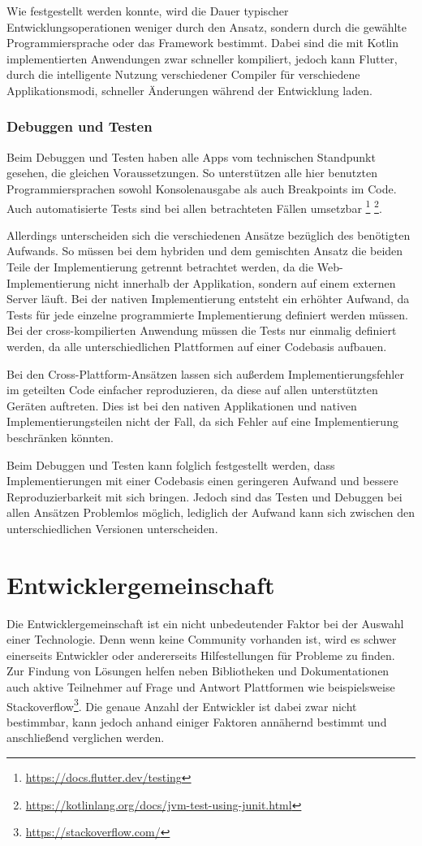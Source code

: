 Wie festgestellt werden konnte, wird die Dauer typischer Entwicklungsoperationen weniger durch den Ansatz, sondern durch die gewählte Programmiersprache oder das Framework bestimmt. Dabei sind die mit Kotlin implementierten Anwendungen zwar schneller kompiliert, jedoch kann Flutter, durch die intelligente Nutzung verschiedener Compiler für verschiedene Applikationsmodi, schneller Änderungen während der Entwicklung laden.

\subsubsection{Debuggen und Testen}
Beim Debuggen und Testen haben alle Apps vom technischen Standpunkt gesehen, die gleichen Voraussetzungen. So unterstützen alle hier benutzten Programmiersprachen sowohl Konsolenausgabe als auch Breakpoints im Code. Auch automatisierte Tests sind bei allen betrachteten Fällen umsetzbar \footnote{\url{https://docs.flutter.dev/testing}} \footnote{\url{https://kotlinlang.org/docs/jvm-test-using-junit.html}}.

Allerdings unterscheiden sich die verschiedenen Ansätze bezüglich des benötigten Aufwands. So müssen bei dem hybriden und dem gemischten Ansatz die beiden Teile der Implementierung getrennt betrachtet werden, da die Web-Implementierung nicht innerhalb der Applikation, sondern auf einem externen Server läuft. Bei der nativen Implementierung entsteht ein erhöhter Aufwand, da Tests für jede einzelne programmierte Implementierung definiert werden müssen. Bei der cross-kompilierten Anwendung müssen die Tests nur einmalig definiert werden, da alle unterschiedlichen Plattformen auf einer Codebasis aufbauen.

Bei den Cross-Plattform-Ansätzen lassen sich außerdem Implementierungsfehler im geteilten Code einfacher reproduzieren, da diese auf allen unterstützten Geräten auftreten. Dies ist bei den nativen Applikationen und nativen Implementierungsteilen nicht der Fall, da sich Fehler auf eine Implementierung beschränken könnten.

Beim Debuggen und Testen kann folglich festgestellt werden, dass Implementierungen mit einer Codebasis einen geringeren Aufwand und bessere Reproduzierbarkeit mit sich bringen. Jedoch sind das Testen und Debuggen bei allen Ansätzen Problemlos möglich, lediglich der Aufwand kann sich zwischen den unterschiedlichen Versionen unterscheiden.

\section{Entwicklergemeinschaft}
Die Entwicklergemeinschaft ist ein nicht unbedeutender Faktor bei der Auswahl einer Technologie. Denn wenn keine Community vorhanden ist, wird es schwer einerseits Entwickler oder andererseits Hilfestellungen für Probleme zu finden. Zur Findung von Lösungen helfen neben Bibliotheken und Dokumentationen auch aktive Teilnehmer auf Frage und Antwort Plattformen wie beispielsweise Stackoverflow\footnote{\url{https://stackoverflow.com/}}.
Die genaue Anzahl der Entwickler ist dabei zwar nicht bestimmbar, kann jedoch anhand einiger Faktoren annähernd bestimmt und anschließend verglichen werden.

